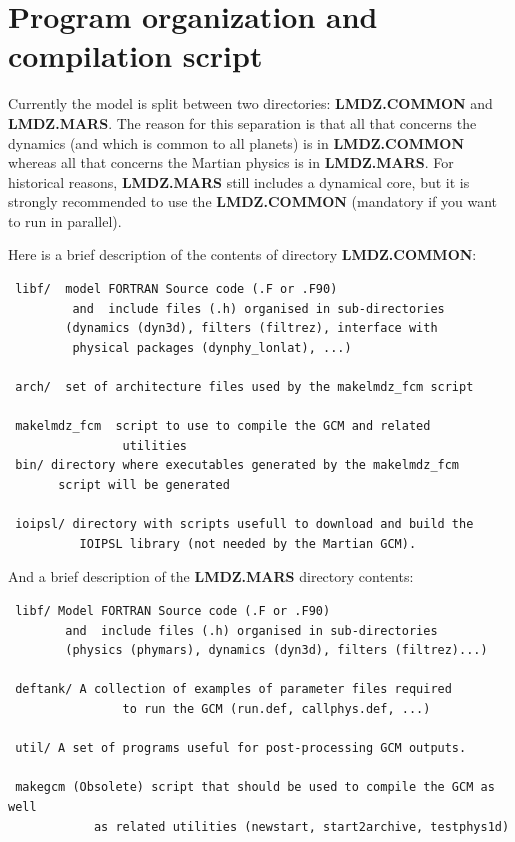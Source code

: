 \chapter{Program organization and compilation script}
\label{sc:info}

\label{loc:contenu} 

Currently the model is split between two directories: {\bf LMDZ.COMMON}
and {\bf LMDZ.MARS}. The reason for this separation is that all that
concerns the dynamics (and which is common to all planets) is in
{\bf LMDZ.COMMON} whereas all that concerns the Martian physics is
in {\bf LMDZ.MARS}. For historical reasons, {\bf LMDZ.MARS} still
includes a dynamical core, but it is strongly recommended to use
the {\bf LMDZ.COMMON} (mandatory if you want to run in parallel).

\noindent Here is a brief description of the contents of directory
{\bf LMDZ.COMMON}:
\begin{verbatim}
 libf/  model FORTRAN Source code (.F or .F90)
         and  include files (.h) organised in sub-directories
        (dynamics (dyn3d), filters (filtrez), interface with
         physical packages (dynphy_lonlat), ...)

 arch/  set of architecture files used by the makelmdz_fcm script

 makelmdz_fcm  script to use to compile the GCM and related
                utilities
 bin/ directory where executables generated by the makelmdz_fcm
       script will be generated

 ioipsl/ directory with scripts usefull to download and build the
          IOIPSL library (not needed by the Martian GCM).
\end{verbatim}

\noindent And a brief description of the
{\bf LMDZ.MARS} directory contents:
\begin{verbatim}
 libf/ Model FORTRAN Source code (.F or .F90)
        and  include files (.h) organised in sub-directories
        (physics (phymars), dynamics (dyn3d), filters (filtrez)...)

 deftank/ A collection of examples of parameter files required 
                to run the GCM (run.def, callphys.def, ...)
  
 util/ A set of programs useful for post-processing GCM outputs.

 makegcm (Obsolete) script that should be used to compile the GCM as well
            as related utilities (newstart, start2archive, testphys1d)
\end{verbatim}


